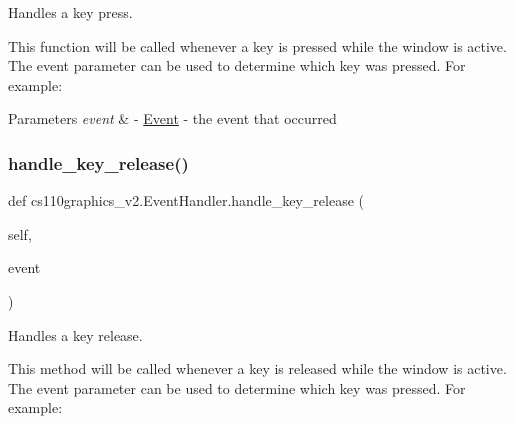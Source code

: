 Handles a key press. 

This function will be called whenever a key is pressed while the window is active. The event parameter can be used to determine which key was pressed. For example\+: 
\begin{DoxyCode}{0}
\DoxyCodeLine{            \textcolor{comment}{\# do something when a is pressed...}}
\DoxyCodeLine{        \textcolor{keywordflow}{else}:}
\DoxyCodeLine{            \textcolor{comment}{\# do something else...}}
\end{DoxyCode}
 
\begin{DoxyParams}{Parameters}
{\em event} & -\/ \mbox{\hyperlink{classcs110graphics__v2_1_1Event}{Event}} -\/ the event that occurred \\
\hline
\end{DoxyParams}
\mbox{\label{classcs110graphics__v2_1_1EventHandler_a955b2d286040398c47d1bb8c05091cf7}} 
\subsubsection{\texorpdfstring{handle\_key\_release()}{handle\_key\_release()}}
{\footnotesize\ttfamily def cs110graphics\+\_\+v2.\+Event\+Handler.\+handle\+\_\+key\+\_\+release (\begin{DoxyParamCaption}\item[{}]{self,  }\item[{}]{event }\end{DoxyParamCaption})}



Handles a key release. 

This method will be called whenever a key is released while the window is active. The event parameter can be used to determine which key was pressed. For example\+: 
\begin{DoxyCode}{0}
\DoxyCodeLine{            \textcolor{comment}{\# do something when a is released...}}
\DoxyCodeLine{        \textcolor{keywordflow}{else}:}
\DoxyCodeLine{            \textcolor{comment}{\# do something else...}}
\end{DoxyCode}
 
